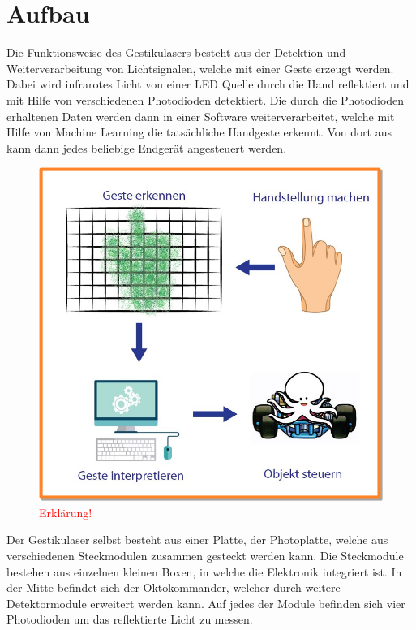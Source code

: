 \chapter{Aufbau}
\label{ch:Funktionsweise und Aufbau}
Die Funktionsweise des Gestikulasers besteht aus der Detektion und Weiterverarbeitung von Lichtsignalen, welche mit einer Geste erzeugt werden. Dabei wird infrarotes Licht von einer LED Quelle durch die Hand reflektiert und mit Hilfe von verschiedenen Photodioden detektiert. Die durch die Photodioden erhaltenen Daten werden dann in einer Software weiterverarbeitet, welche mit Hilfe von Machine Learning die tatsächliche Handgeste erkennt. Von dort aus kann dann jedes beliebige Endgerät angesteuert werden.

\begin{figure}[h]
	\centering
	\includegraphics[scale=0.8]{../figures/AblaufGestikulaser.png}
	\caption{\textcolor{red}{Erklärung!}}
	\label{fig:AblaufGestikulaser}
\end{figure}

Der Gestikulaser selbst besteht aus einer Platte, der Photoplatte, welche aus verschiedenen Steckmodulen zusammen gesteckt werden kann. Die Steckmodule bestehen aus einzelnen kleinen Boxen, in welche die Elektronik integriert ist. In der Mitte befindet sich der Oktokommander, welcher durch weitere Detektormodule erweitert werden kann. Auf jedes der Module befinden sich vier Photodioden um das reflektierte Licht zu messen. 


